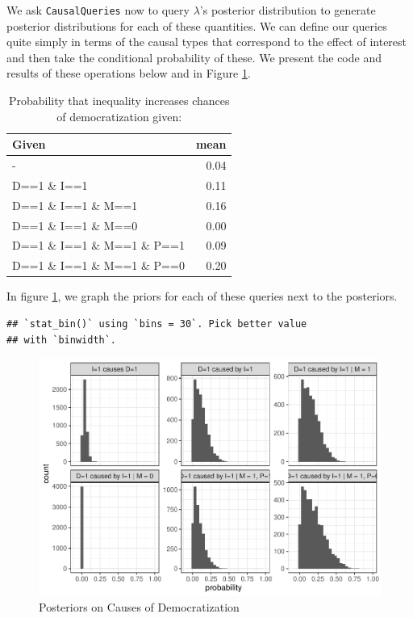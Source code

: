 \documentclass[
  12pt,
]{book}
\begin{document}
We ask \texttt{CausalQueries} now to query \(\lambda\)'s posterior distribution to generate posterior distributions for each of these quantities. We can define our queries quite simply in terms of the causal types that correspond to the effect of interest and then take the conditional probability of these. We present the code and results of these operations below and in Figure \ref{fig:mixedhist}.

\begin{table}

\caption{\label{tab:unnamed-chunk-23}Probability that inequality increases chances of democratization given:}
\centering
\begin{tabular}[t]{l|r}
\hline
Given & mean\\
\hline
- & 0.04\\
\hline
D==1 \& I==1 & 0.11\\
\hline
D==1 \& I==1 \& M==1 & 0.16\\
\hline
D==1 \& I==1 \& M==0 & 0.00\\
\hline
D==1 \& I==1 \& M==1 \& P==1 & 0.09\\
\hline
D==1 \& I==1 \& M==1 \& P==0 & 0.20\\
\hline
\end{tabular}
\end{table}

In figure \ref{fig:mixedhist}, we graph the priors for each of these queries next to the posteriors.

\begin{verbatim}
## `stat_bin()` using `bins = 30`. Pick better value
## with `binwidth`.
\end{verbatim}

\begin{figure}
\centering
\includegraphics{ii_files/figure-latex/mixedhist-1.pdf}
\caption{\label{fig:mixedhist}Posteriors on Causes of Democratization}
\end{figure}
\end{document}
